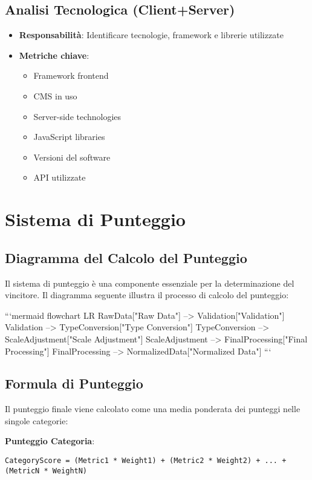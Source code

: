 \subsection{Analisi Tecnologica (Client+Server)}
\begin{itemize}
    \item \textbf{Responsabilità}: Identificare tecnologie, framework e librerie utilizzate
    \item \textbf{Metriche chiave}:
    \begin{itemize}
        \item Framework frontend
        \item CMS in uso
        \item Server-side technologies
        \item JavaScript libraries
        \item Versioni del software
        \item API utilizzate
    \end{itemize}
\end{itemize}

\section{Sistema di Punteggio}

\subsection{Diagramma del Calcolo del Punteggio}
Il sistema di punteggio è una componente essenziale per la determinazione del vincitore. Il diagramma seguente illustra il processo di calcolo del punteggio:

```mermaid
flowchart LR
    RawData["Raw Data"] --> Validation["Validation"]
    Validation --> TypeConversion["Type Conversion"]
    TypeConversion --> ScaleAdjustment["Scale Adjustment"]
    ScaleAdjustment --> FinalProcessing["Final Processing"]
    FinalProcessing --> NormalizedData["Normalized Data"]
```

\subsection{Formula di Punteggio}
Il punteggio finale viene calcolato come una media ponderata dei punteggi nelle singole categorie:

\textbf{Punteggio Categoria}:
\begin{verbatim}
CategoryScore = (Metric1 * Weight1) + (Metric2 * Weight2) + ... + (MetricN * WeightN)
\end{verbatim}

